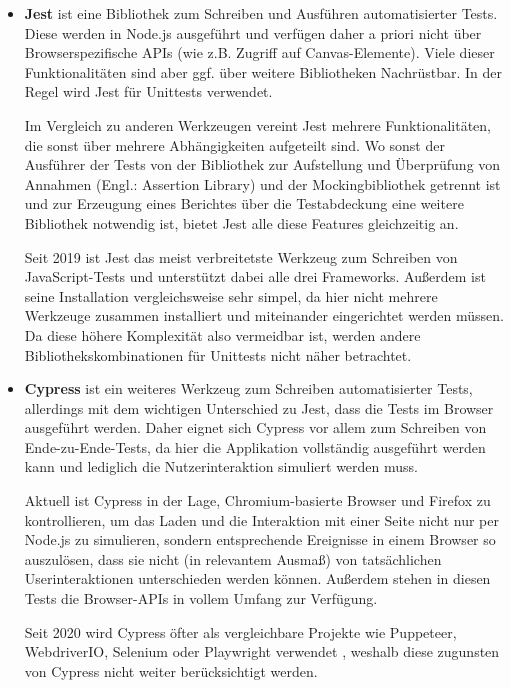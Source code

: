 \begin{itemize}
Zugunsten von SCSS / Sass wurde auf die weitere Überprüfung anderer Präprozessoren wie Less\footnote{\url{https://lesscss.org/}} verzichtet.

\item \textbf{Jest} ist eine Bibliothek zum Schreiben und Ausführen automatisierter Tests. Diese werden in Node.js ausgeführt und verfügen daher a priori nicht über Browserspezifische APIs (wie z.B. Zugriff auf Canvas-Elemente). Viele dieser Funktionalitäten sind aber ggf. über weitere Bibliotheken Nachrüstbar. In der Regel wird Jest für Unittests verwendet.

Im Vergleich zu anderen Werkzeugen vereint Jest mehrere Funktionalitäten, die sonst über mehrere Abhängigkeiten aufgeteilt sind. Wo sonst der Ausführer der Tests von der Bibliothek zur Aufstellung und Überprüfung von Annahmen (Engl.: \glqq Assertion Library\grqq) und der Mockingbibliothek getrennt ist und zur Erzeugung eines Berichtes über die Testabdeckung eine weitere Bibliothek notwendig ist, bietet Jest alle diese Features gleichzeitig an.

Seit 2019 ist Jest das meist verbreitetste Werkzeug zum Schreiben von JavaScript-Tests \cite{stateofjs} und unterstützt dabei alle drei Frameworks. Außerdem ist seine Installation vergleichsweise sehr simpel, da hier nicht mehrere Werkzeuge zusammen installiert und miteinander eingerichtet werden müssen. Da diese höhere Komplexität also vermeidbar ist, werden andere Bibliothekskombinationen für Unittests nicht näher betrachtet.

\item \textbf{Cypress} ist ein weiteres Werkzeug zum Schreiben automatisierter Tests, allerdings mit dem wichtigen Unterschied zu Jest, dass die Tests im Browser ausgeführt werden. Daher eignet sich Cypress vor allem zum Schreiben von Ende-zu-Ende-Tests, da hier die Applikation vollständig ausgeführt werden kann und lediglich die Nutzerinteraktion simuliert werden muss.

Aktuell ist Cypress in der Lage, Chromium-basierte Browser und Firefox zu kontrollieren, um das Laden und die Interaktion mit einer Seite nicht nur per Node.js zu simulieren, sondern entsprechende Ereignisse in einem Browser so auszulösen, dass sie nicht (in relevantem Ausmaß) von tatsächlichen Userinteraktionen unterschieden werden können. Außerdem stehen in diesen Tests die Browser-APIs in vollem Umfang zur Verfügung.

Seit 2020 wird Cypress öfter als vergleichbare Projekte wie Puppeteer, WebdriverIO, Selenium oder Playwright verwendet \cite{stateofjs}, weshalb diese zugunsten von Cypress nicht weiter berücksichtigt werden.


\end{itemize}
